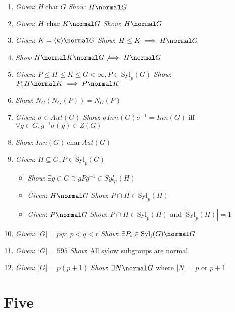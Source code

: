\begin{enumerate}
\def\labelenumi{\arabic{enumi}.}
\item
  \emph{Given}: $H~\text{char}~G$ \emph{Show}: $H \normal G$
\item
  \emph{Given}: $H ~\text{char}~ K \normal G$ \emph{Show}: $H \normal G$
\item
  \emph{Given}: $K = \langle k \rangle \normal G$ \emph{Show}:
  $H \leq K \implies H \normal G$
\item
  \emph{Show} $H \normal K \normal G \not\implies H \normal G$
\item
  \emph{Given}: $P \leq H \leq K \leq G < \infty, P \in \text{Syl}_p(G)$
  \emph{Show}: $P, H \normal K \implies P \normal K$
\item
  \emph{Show}: $N_G(N_G(P)) = N_G(P)$
\item
  \emph{Given}: $\sigma \in Aut(G)$ \emph{Show}:
  $\sigma Inn(G) \sigma^{-1} = Inn(G)$ iff
  $\forall g\in G, g^{-1}\sigma(g)\in Z(G)$
\item
  \emph{Show}: $Inn(G) ~\text{char}~ Aut(G)$
\item
  \emph{Given}: $H \subseteq G, P \in \text{Syl}_p(G)$

  \begin{itemize}
  \tightlist
  \item
    \emph{Show}: $\exists g \in G \ni gPg^{-1} \in Syl_p(H)$
  \item
    \emph{Given}: $H \normal G$ \emph{Show}:
    $P\cap H \in \text{Syl}_p(H)$
  \item
    \emph{Given}: $P \normal G$ \emph{Show}:
    $P \cap H \in \text{Syl}_p(H)$ and $|\text{Syl}_p(H)| = 1$
  \end{itemize}
\item
  \emph{Given}: $|G| = pqr, p < q < r$ \emph{Show}:
  $\exists P_i \in \text{Syl}_i(G) \normal G$
\item
  \emph{Given}: $|G| =595$ \emph{Show}: All sylow subgroups are normal
\item
  \emph{Given}: $|G| = p(p+1)$ \emph{Show}: $\exists N \normal G$ where
  $|N| = p$ or $p+1$
\end{enumerate}

\hypertarget{five}{%
\section{Five}\label{five}}

